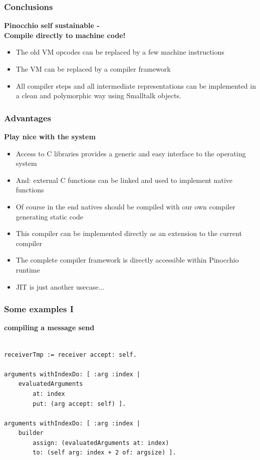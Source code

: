 \documentclass{beamer}
\begin{document}
\begin{frame}[fragile]
    \frametitle{Conclusions}
    {\bf Pinocchio self sustainable - \\Compile directly to machine code!}
    \begin{itemize}
        \item The old VM opcodes can be replaced by a few machine instructions
        \item The VM can be replaced by a compiler framework
        \item All compiler steps and all intermediate representations can 
            be implemented in a clean and polymorphic way using Smalltalk objects.
    \end{itemize}
\end{frame}

\begin{frame}[fragile]
    \frametitle{Advantages}
    {\bf Play nice with the system}
    \begin{itemize}
        \item Access to C libraries provides a generic and easy interface to the operating system
        \item And: external C functions can be linked and used to implement native functions
        \item Of course in the end natives should be compiled with our own 
                compiler generating static code
        \item This compiler can be implemented directly as an extension to the current compiler
        \item The complete compiler framework is directly accessible within Pinocchio runtime
        \item JIT is just another usecase...
    \end{itemize}
\end{frame}


\lstset{language=Smalltalk}

\begin{frame}[fragile]
    \frametitle{Some examples I}
    {\bf compiling a message send}
    \begin{lstlisting}

receiverTmp := receiver accept: self.
    
arguments withIndexDo: [ :arg :index |
    evaluatedArguments 
        at: index 
        put: (arg accept: self) ].
    
arguments withIndexDo: [ :arg :index |
    builder
        assign: (evaluatedArguments at: index)
        to: (self arg: index + 2 of: argsize) ].
    \end{lstlisting}
\end{frame}
\end{document}
